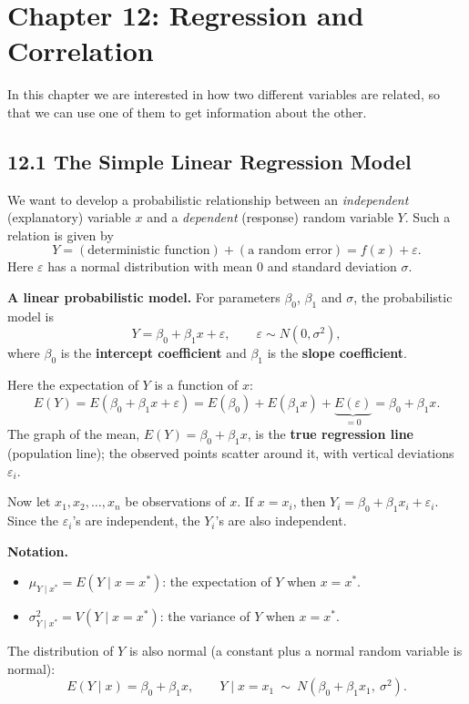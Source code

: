 \section*{Chapter 12: Regression and Correlation}

In this chapter we are interested in how two different variables are related, so that we can use one of them to get information about the other.

\subsection*{12.1 The Simple Linear Regression Model}

We want to develop a probabilistic relationship between an \emph{independent} (explanatory) variable $x$ and a \emph{dependent} (response) random variable $Y$.
Such a relation is given by
\[
Y = (\text{deterministic function}) + (\text{a random error}) = f(x)+\varepsilon .
\]
Here $\varepsilon$ has a normal distribution with mean 0 and standard deviation $\sigma$.

\textbf{A linear probabilistic model.} For parameters $\beta_0$, $\beta_1$ and $\sigma$, the probabilistic model is
\[
Y=\beta_0+\beta_1x+\varepsilon,\qquad \varepsilon\sim N(0,\sigma^2),
\]
where $\beta_0$ is the \textbf{intercept coefficient} and $\beta_1$ is the \textbf{slope coefficient}.

Here the expectation of $Y$ is a function of $x$:
\[
E(Y) = E(\beta_0+\beta_1x+\varepsilon) = E(\beta_0)+E(\beta_1x)+\underbrace{E(\varepsilon)}_{=0} = \beta_0+\beta_1x .
\]
The graph of the mean, $E(Y)=\beta_0+\beta_1x$, is the \textbf{true regression line} (population line); the observed points scatter around it, with vertical deviations $\varepsilon_i$.


Now let $x_1,x_2,\dots,x_n$ be observations of $x$. If $x=x_i$, then $Y_i=\beta_0+\beta_1x_i+\varepsilon_i$.
Since the $\varepsilon_i$'s are independent, the $Y_i$'s are also independent.

\textbf{Notation.}
\begin{itemize}
  \item $\mu_{Y\mid x^*}=E(Y\mid x=x^*)$: the expectation of $Y$ when $x=x^*$.
  \item $\sigma^2_{Y\mid x^*}=V(Y\mid x=x^*)$: the variance of $Y$ when $x=x^*$.
\end{itemize}
The distribution of $Y$ is also normal (a constant plus a normal random variable is normal):
\[
E(Y\mid x)=\beta_0+\beta_1x,\qquad Y\mid x=x_1\ \sim\ N(\beta_0+\beta_1x_1,\ \sigma^2).
\]


